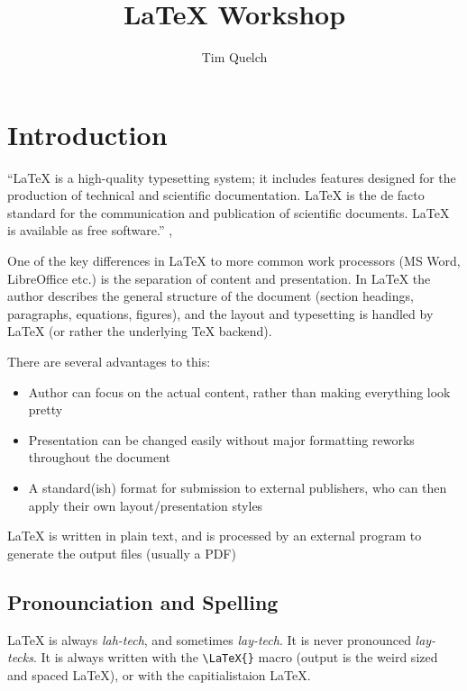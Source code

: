\documentclass{article}
\title{\LaTeX{} Workshop}
\author{Tim Quelch}
\begin{document}
\maketitle

\tableofcontents
\listoffigures
\listoftables

\newpage

\section{Introduction}
``\LaTeX{} is a high-quality typesetting system; it includes features designed for the production of technical and scientific documentation. \LaTeX{} is the de facto standard for the communication and publication of scientific documents. \LaTeX{} is available as free software.''
\parencite{latex_project_latex_2018},

One of the key differences in \LaTeX{} to more common work processors (MS Word, LibreOffice etc.) is the separation of content and presentation. In \LaTeX{} the author describes the general structure of the document (section headings, paragraphs, equations, figures), and the layout and typesetting is handled by \LaTeX{} (or rather the underlying \TeX{} backend).

There are several advantages to this:
\begin{itemize}
  \item Author can focus on the actual content, rather than making everything look pretty
  \item Presentation can be changed easily without major formatting reworks throughout the document
  \item A standard(ish) format for submission to external publishers, who can then apply their own layout/presentation styles
\end{itemize}

\LaTeX{} is written in plain text, and is processed by an external program to generate the output files (usually a PDF)

\subsection{Pronounciation and Spelling}
\LaTeX{} is always \emph{lah-tech}, and sometimes \emph{lay-tech}. It is never pronounced \emph{lay-tecks}. It is always written with the \lstinline|\LaTeX{}| macro (output is the weird sized and spaced \LaTeX{}), or with the capitialistaion LaTeX.
\end{document}
